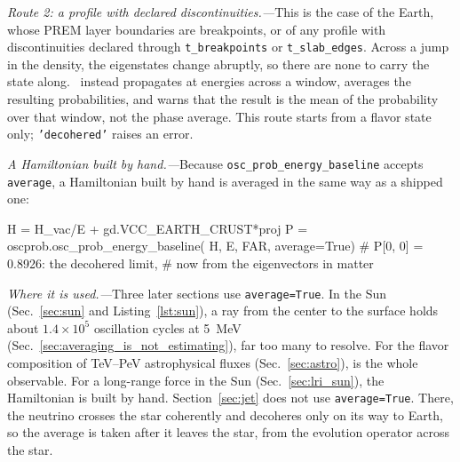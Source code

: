 \textit{Route 2: a profile with declared discontinuities.---}This is the case of the Earth, whose PREM layer boundaries are breakpoints, or of any profile with discontinuities declared through {\tt t\_breakpoints} or {\tt t\_slab\_edges}. Across a jump in the density, the eigenstates change abruptly, so there are none to carry the state along. \magnus\ instead propagates at energies across a window, averages the resulting probabilities, and warns that the result is the mean of the probability over that window, not the phase average. This route starts from a flavor state only; {\tt 'decohered'} raises an error.

\smallskip

\textit{A Hamiltonian built by hand.---}Because {\tt osc\_prob\_energy\_baseline} accepts {\tt average}, a Hamiltonian built by hand is averaged in the same way as a shipped one:
\begin{pysnip}
H = H_vac/E + gd.VCC_EARTH_CRUST*proj
P = oscprob.osc_prob_energy_baseline(
    H, E, FAR, average=True)
# P[0, 0] = 0.8926: the decohered limit,
# now from the eigenvectors in matter
\end{pysnip}

\smallskip

\textit{Where it is used.---}Three later sections use {\tt average=True}. In the Sun (Sec.~\ref{sec:sun} and Listing~\ref{lst:sun}), a ray from the center to the surface holds about $1.4 \times 10^{5}$ oscillation cycles at 5~MeV (Sec.~\ref{sec:averaging_is_not_estimating}), far too many to resolve. For the flavor composition of TeV--PeV astrophysical fluxes (Sec.~\ref{sec:astro}),  is the whole observable. For a long-range force in the Sun (Sec.~\ref{sec:lri_sun}), the Hamiltonian is built by hand. Section~\ref{sec:jet} does not use {\tt average=True}. There, the neutrino crosses the star coherently and decoheres only on its way to Earth, so the average is taken after it leaves the star, from the evolution operator across the star.
